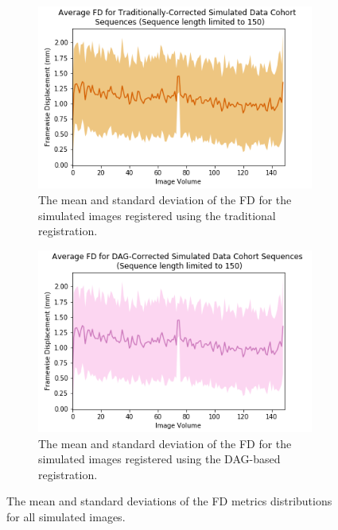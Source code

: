 \begin{figure}[t]
	\begin{subfigure}{0.45\textwidth}
		\centering
		\includegraphics[width=1\textwidth]{6/figures/spectr-trad-fd-150.png}
		\caption{The mean and standard deviation of the FD for the simulated images registered using the traditional registration.}
	\end{subfigure}%
	\vspace{0.1\textwidth}
	\begin{subfigure}{0.45\textwidth}
		\centering
		\includegraphics[width=1\textwidth]{6/figures/spectr-dag-fd-150.png}
		\caption{The mean and standard deviation of the FD for the simulated images registered using the DAG-based registration.}
	\end{subfigure}
\caption{The mean and standard deviations of the FD metrics distributions for all simulated images.}
\label{fig:spectr-fd-150}
\end{figure}

